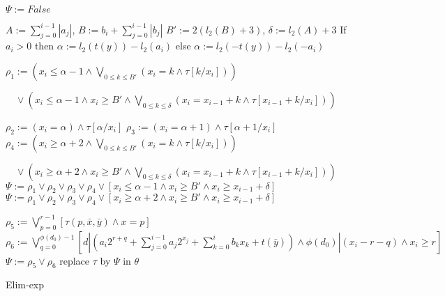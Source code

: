 
\begin{algorithm}[t]
    \SetAlgoLined
    
    {
        $\Psi:= \textit{False}$\;
        { 
            $A :=  \sum_{j=0}^{i-1}|a_j|$, $B:= b_i + \sum_{j=0}^{i-1}|b_j|$\;
            $B':= 2(l_2(B)+3)$, $\delta:=  l_2(A)+3$\;
            If $a_i>0$ then $\alpha := l_2(t(y))-l_2(a_i)$
            else $\alpha := l_2(-t(y))-l_2(-a_i)$\;
            
            $\rho_1 :=  (x_i \le \alpha -1 \wedge \bigvee_{0\le k\le B'}(x_i=k \wedge \tau[k/x_i] ))$
    
            $\quad \vee ( x_i \le \alpha -1 \wedge x_i\ge B' \wedge \bigvee_{0\le k \le \delta} (x_i = x_{i-1}+k \wedge \tau[x_{i-1}+k/x_i]))$\;
                
            $\rho_2 :=  (x_i = \alpha) \wedge \tau[\alpha/x_i]$\;
            $\rho_3 :=  (x_i = \alpha+1) \wedge \tau[\alpha+1/x_i]$\;
            $\rho_4 :=  (x_i \ge \alpha+2 \wedge \bigvee_{0\le k\le B'}(x_i=k \wedge \tau[k/x_i] ))$
        
            $\quad \vee (x_i \ge \alpha +2 \wedge x_i\ge B' \wedge \bigvee_{0\le k \le \delta}(x_i = x_{i-1}+k \wedge \tau[x_{i-1}+k/x_i]))
            $\;
            {
                $\Psi := \rho_1 \vee \rho_2 \vee \rho_3 \vee \rho_4 
                \vee [x_i \le \alpha -1 \wedge x_i \ge B' \wedge x_i \ge x_{i-1}+\delta]$
            }
            {
                $\Psi := \rho_1 \vee \rho_2 \vee \rho_3 \vee \rho_4 
                \vee [x_i \ge \alpha +2 \wedge x_i \ge B' \wedge x_i \ge x_{i-1}+\delta]$    
            }
            }
        {
            $\rho_5 := \bigvee_{p=0}^{r-1} [\tau(p,\bar{x},\bar{y})\wedge x=p]$\;
            $\rho_6 := \bigvee_{q=0}^{\phi(d_0)-1} [d|(a_i 2^{r+q}+\sum_{j=0}^{i-1} a_j 2^{x_j}
            +  \sum_{k=0}^{i} b_k x_k+t(\bar{y})) \wedge \phi(d_0)|(x_i-r-q) \wedge x_i \ge r]
            $\;
            $\Psi :=  \rho_5 \vee \rho_6$
        }
        replace $\tau$ by $\Psi$ in $\theta$\;
    }
    \caption{Elim-exp}
\end{algorithm}


